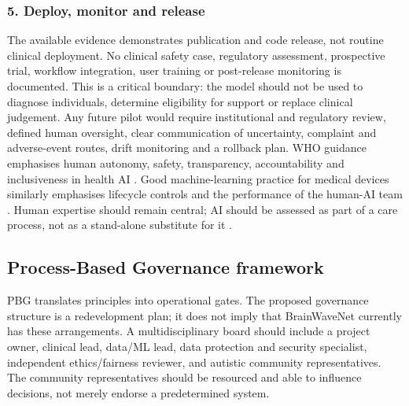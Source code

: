 \documentclass[11pt,a4paper]{article}
\begin{document}
\subsubsection{5. Deploy, monitor and release}
The available evidence demonstrates publication and code release, not routine clinical deployment. No clinical safety case, regulatory assessment, prospective trial, workflow integration, user training or post-release monitoring is documented. This is a critical boundary: the model should not be used to diagnose individuals, determine eligibility for support or replace clinical judgement. Any future pilot would require institutional and regulatory review, defined human oversight, clear communication of uncertainty, complaint and adverse-event routes, drift monitoring and a rollback plan. WHO guidance emphasises human autonomy, safety, transparency, accountability and inclusiveness in health AI \parencite{who2021}. Good machine-learning practice for medical devices similarly emphasises lifecycle controls and the performance of the human-AI team \parencite{gmlp2021}. Human expertise should remain central; AI should be assessed as part of a care process, not as a stand-alone substitute for it \parencite{topol2019}.

\subsection{Process-Based Governance framework}
PBG translates principles into operational gates. The proposed governance structure is a redevelopment plan; it does not imply that BrainWaveNet currently has these arrangements. A multidisciplinary board should include a project owner, clinical lead, data/ML lead, data protection and security specialist, independent ethics/fairness reviewer, and autistic community representatives. The community representatives should be resourced and able to influence decisions, not merely endorse a predetermined system.
\end{document}
